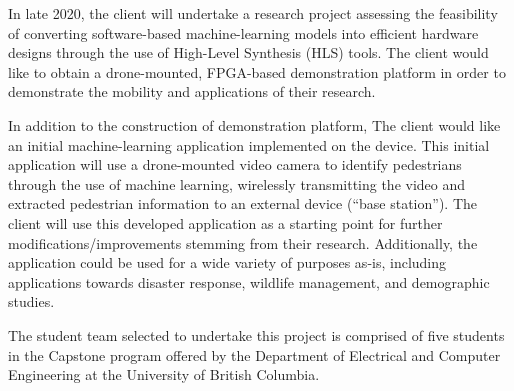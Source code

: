 In late 2020, the client will undertake a research project assessing the feasibility of converting software-based machine-learning models into efficient hardware designs through the use of High-Level Synthesis (HLS) tools. The client would like to obtain a drone-mounted, FPGA-based demonstration platform in order to demonstrate the mobility and applications of their research. 

In addition to the construction of demonstration platform, The client would like an initial machine-learning application implemented on the device. This initial application will use a drone-mounted video camera to identify pedestrians through the use of machine learning, wirelessly transmitting the video and extracted pedestrian information to an external device (``base station''). The client will use this developed application as a starting point for further modifications/improvements stemming from their research. Additionally, the application could be used for a wide variety of purposes as-is, including applications towards disaster response, wildlife management, and demographic studies.

The student team selected to undertake this project is comprised of five students in the Capstone program offered by the Department of Electrical and Computer Engineering at the University of British Columbia.
